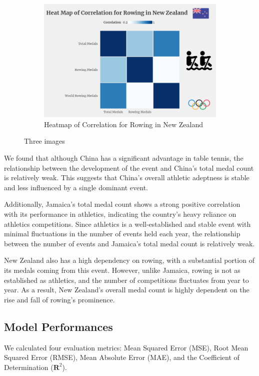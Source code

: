 \documentclass[12pt]{article}  %
\begin{document}
\begin{figure}[htbp]
\begin{subfigure}[b]{.32\textwidth}
		\includegraphics[width=\textwidth]{img/New Zealand.png}
		\caption{Heatmap of Correlation for Rowing in New Zealand}\label{subfig:3}
	\end{subfigure}
	\caption{Three images}\label{fig:subfigures}
\end{figure}

We found that although China has a significant advantage in table tennis, the relationship between the development of the event and China's total medal count is relatively weak. This suggests that China's overall athletic adeptness is stable and less influenced by a single dominant event.

Additionally, Jamaica's total medal count shows a strong positive correlation with its performance in athletics, indicating the country's heavy reliance on athletics competitions. Since athletics is a well-established and stable event with minimal fluctuations in the number of events held each year, the relationship between the number of events and Jamaica's total medal count is relatively weak. 

New Zealand also has a high dependency on rowing, with a substantial portion of its medals coming from this event. However, unlike Jamaica, rowing is not as established as athletics, and the number of competitions fluctuates from year to year. As a result, New Zealand's overall medal count is highly dependent on the rise and fall of rowing's prominence.
\subsection{Model Performances}

We calculated four evaluation metrics: Mean Squared Error (MSE), Root Mean Squared Error (RMSE), Mean Absolute Error (MAE), and the Coefficient of Determination (\(\mathbf{R}^2\)).
\end{document}
